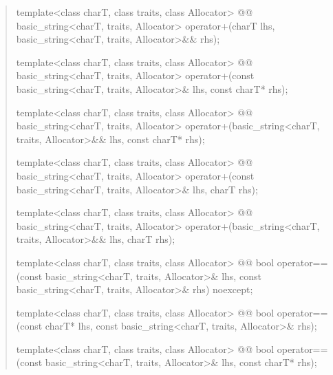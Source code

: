 \documentclass{wg21}
\begin{document}
\begin{quote}
\begin{itemdecl}
template<class charT, class traits, class Allocator>
  @@
  basic_string<charT, traits, Allocator>
    operator+(charT lhs, basic_string<charT, traits, Allocator>&& rhs);
\end{itemdecl}

\begin{itemdecl}
template<class charT, class traits, class Allocator>
  @@
  basic_string<charT, traits, Allocator>
    operator+(const basic_string<charT, traits, Allocator>& lhs, const charT* rhs);
\end{itemdecl}

\begin{itemdecl}
template<class charT, class traits, class Allocator>
  @@
  basic_string<charT, traits, Allocator>
    operator+(basic_string<charT, traits, Allocator>&& lhs, const charT* rhs);
\end{itemdecl}

\begin{itemdecl}
template<class charT, class traits, class Allocator>
  @@
  basic_string<charT, traits, Allocator>
    operator+(const basic_string<charT, traits, Allocator>& lhs, charT rhs);
\end{itemdecl}

\begin{itemdecl}
template<class charT, class traits, class Allocator>
  @@
  basic_string<charT, traits, Allocator>
    operator+(basic_string<charT, traits, Allocator>&& lhs, charT rhs);
\end{itemdecl}

\begin{itemdecl}
template<class charT, class traits, class Allocator>
  @@
  bool operator==(const basic_string<charT, traits, Allocator>& lhs,
                  const basic_string<charT, traits, Allocator>& rhs) noexcept;
\end{itemdecl}

\begin{itemdecl}
template<class charT, class traits, class Allocator>
  @@
  bool operator==(const charT* lhs, const basic_string<charT, traits, Allocator>& rhs);
\end{itemdecl}

\begin{itemdecl}
template<class charT, class traits, class Allocator>
  @@
  bool operator==(const basic_string<charT, traits, Allocator>& lhs, const charT* rhs);
\end{itemdecl}


\end{quote}
\end{document}
